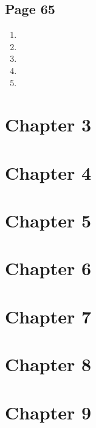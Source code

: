 \documentclass{article}
\newenvironment{solutions}[1]
{\subsection*{#1}
 \begin{enumerate}[leftmargin=0cm,itemindent=.5cm]}
{\end{enumerate}}
\newcommand{\solution}{\item}
\begin{document}
\begin{solutions}{Page 65}
\solution
\solution
\solution
\solution
\solution
\end{solutions}

\section*{Chapter 3}


\section*{Chapter 4}


\section*{Chapter 5}


\section*{Chapter 6}


\section*{Chapter 7}


\section*{Chapter 8}


\section*{Chapter 9}
\end{document}
